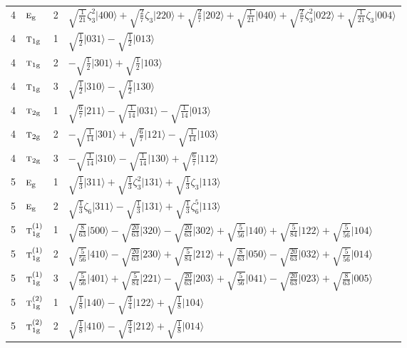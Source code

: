 \documentclass[11pt]{article}
\newcommand{\irr}[1]{\text{\normalfont\scshape #1}}
\newcommand{\ptag}[1]{\mathrm{#1}}
\newcommand{\rootunity}[1]{\zeta_{#1}}
\newcommand{\occ}[1]{\lvert #1\rangle}
\begin{document}
\begin{longtable}{c l c p{}}
4 & $\irr{e}_{\ptag{g}}$ & 2 & $\sqrt{\tfrac{1}{21}}\rootunity{3}^{2}\occ{400}+\sqrt{\tfrac{2}{7}}\rootunity{3}\occ{220}+\sqrt{\tfrac{2}{7}}\occ{202}+\sqrt{\tfrac{1}{21}}\occ{040}+\sqrt{\tfrac{2}{7}}\rootunity{3}^{2}\occ{022}+\sqrt{\tfrac{1}{21}}\rootunity{3}\occ{004}$\\
4 & $\irr{t}_{1\ptag{g}}$ & 1 & $\sqrt{\tfrac{1}{2}}\occ{031}-\sqrt{\tfrac{1}{2}}\occ{013}$\\
4 & $\irr{t}_{1\ptag{g}}$ & 2 & $-\sqrt{\tfrac{1}{2}}\occ{301}+\sqrt{\tfrac{1}{2}}\occ{103}$\\
4 & $\irr{t}_{1\ptag{g}}$ & 3 & $\sqrt{\tfrac{1}{2}}\occ{310}-\sqrt{\tfrac{1}{2}}\occ{130}$\\
4 & $\irr{t}_{2\ptag{g}}$ & 1 & $\sqrt{\tfrac{6}{7}}\occ{211}-\sqrt{\tfrac{1}{14}}\occ{031}-\sqrt{\tfrac{1}{14}}\occ{013}$\\
4 & $\irr{t}_{2\ptag{g}}$ & 2 & $-\sqrt{\tfrac{1}{14}}\occ{301}+\sqrt{\tfrac{6}{7}}\occ{121}-\sqrt{\tfrac{1}{14}}\occ{103}$\\
4 & $\irr{t}_{2\ptag{g}}$ & 3 & $-\sqrt{\tfrac{1}{14}}\occ{310}-\sqrt{\tfrac{1}{14}}\occ{130}+\sqrt{\tfrac{6}{7}}\occ{112}$\\
\hline
5 & $\irr{e}_{\ptag{g}}$ & 1 & $\sqrt{\tfrac{1}{3}}\occ{311}+\sqrt{\tfrac{1}{3}}\rootunity{3}^{2}\occ{131}+\sqrt{\tfrac{1}{3}}\rootunity{3}\occ{113}$\\
5 & $\irr{e}_{\ptag{g}}$ & 2 & $\sqrt{\tfrac{1}{3}}\rootunity{6}\occ{311}-\sqrt{\tfrac{1}{3}}\occ{131}+\sqrt{\tfrac{1}{3}}\rootunity{6}^{5}\occ{113}$\\
5 & $\irr{t}_{1\ptag{g}}^{(1)}$ & 1 & $\sqrt{\tfrac{8}{63}}\occ{500}-\sqrt{\tfrac{20}{63}}\occ{320}-\sqrt{\tfrac{20}{63}}\occ{302}+\sqrt{\tfrac{5}{56}}\occ{140}+\sqrt{\tfrac{5}{84}}\occ{122}+\sqrt{\tfrac{5}{56}}\occ{104}$\\
5 & $\irr{t}_{1\ptag{g}}^{(1)}$ & 2 & $\sqrt{\tfrac{5}{56}}\occ{410}-\sqrt{\tfrac{20}{63}}\occ{230}+\sqrt{\tfrac{5}{84}}\occ{212}+\sqrt{\tfrac{8}{63}}\occ{050}-\sqrt{\tfrac{20}{63}}\occ{032}+\sqrt{\tfrac{5}{56}}\occ{014}$\\
5 & $\irr{t}_{1\ptag{g}}^{(1)}$ & 3 & $\sqrt{\tfrac{5}{56}}\occ{401}+\sqrt{\tfrac{5}{84}}\occ{221}-\sqrt{\tfrac{20}{63}}\occ{203}+\sqrt{\tfrac{5}{56}}\occ{041}-\sqrt{\tfrac{20}{63}}\occ{023}+\sqrt{\tfrac{8}{63}}\occ{005}$\\
5 & $\irr{t}_{1\ptag{g}}^{(2)}$ & 1 & $\sqrt{\tfrac{1}{8}}\occ{140}-\sqrt{\tfrac{3}{4}}\occ{122}+\sqrt{\tfrac{1}{8}}\occ{104}$\\
5 & $\irr{t}_{1\ptag{g}}^{(2)}$ & 2 & $\sqrt{\tfrac{1}{8}}\occ{410}-\sqrt{\tfrac{3}{4}}\occ{212}+\sqrt{\tfrac{1}{8}}\occ{014}$\\

\end{longtable}
\end{document}
